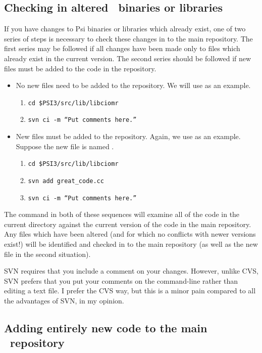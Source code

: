 \subsection{Checking in altered \PSIthree\ binaries or libraries}

If you have changes to Psi binaries or libraries which already exist, one
of two series of steps is necessary to check these changes in to the main
repository. The first series may be followed if all changes have been made
only to files which already exist in the current version. The second series
should be followed if new files must be added to the code in the repository.

\begin{itemize}
\item No new files need to be added to the repository. We will use
 as an example. 
\begin{enumerate}
\item {\tt cd \$PSI3/src/lib/libciomr}
\item {\tt svn ci -m ``Put comments here.''}
\end{enumerate}
\item New files must be added to the repository. Again, we use 
as an example. Suppose the new file is named  .
\begin{enumerate}
\item {\tt cd \$PSI3/src/lib/libciomr} 
\item {\tt svn add great\_code.cc} 
\item {\tt svn ci -m ``Put comments here.''}
\end{enumerate}
\end{itemize}

The  command in both of these sequences will examine all
of the code in the current  directory against the
current version of the code in the main repository. Any files which
have been altered (and for which no conflicts with newer versions
exist!) will be identified and checked in to the main repository (as
well as the new file in the second situation).

SVN requires that you include a comment on your changes.  However,
unlike CVS, SVN prefers that you put your comments on the command-line
rather than editing a text file.  I prefer the CVS way, but this is a
minor pain compared to all the advantages of SVN, in my opinion.

\subsection{Adding entirely new code to the main \PSIthree\ repository} 
\label{checkin_new}

